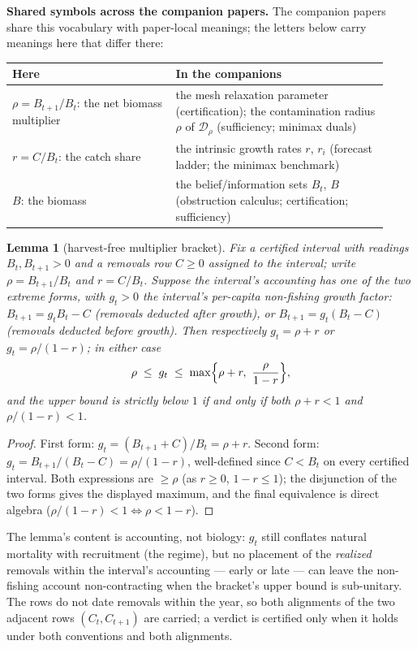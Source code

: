 \documentclass[10pt,twocolumn]{article}
\theoremstyle{plain}
\newtheorem{lemma}[theorem]{Lemma}
\theoremstyle{remark}
\begin{document}
\medskip
\noindent\textbf{Shared symbols across the companion papers.} The
companion papers share this vocabulary with paper-local meanings; the
letters below carry meanings here that differ there:
\begin{center}\small
\begin{tabular}{@{}p{0.40\linewidth}p{0.52\linewidth}@{}}
\toprule
\textbf{Here} & \textbf{In the companions} \\
\midrule
\(\rho = B_{t+1}/B_t\): the net biomass multiplier &
the mesh relaxation parameter (certification); the contamination radius
\(\rho\) of \(\mathcal{D}_{\rho}\) (sufficiency; minimax duals) \\
\(r = C/B_t\): the catch share &
the intrinsic growth rates \(r\), \(r_{i}\) (forecast ladder; the
minimax benchmark) \\
\(B\): the biomass &
the belief/information sets \(B_t\), \(B\) (obstruction calculus;
certification; sufficiency) \\
\bottomrule
\end{tabular}
\end{center}

\begin{lemma}[harvest-free multiplier bracket]\label{lem:bracket}
Fix a certified interval with readings \(B_t, B_{t+1} > 0\) and a
removals row \(C \ge 0\) assigned to the interval; write
\(\rho = B_{t+1}/B_t\) and \(r = C/B_t\). Suppose the interval's
accounting has one of the two extreme forms, with \(g_t > 0\) the
interval's per-capita non-fishing growth factor:
\(B_{t+1} = g_t B_t - C\) (removals deducted after growth), or
\(B_{t+1} = g_t (B_t - C)\) (removals deducted before growth). Then
respectively \(g_t = \rho + r\) or \(g_t = \rho/(1-r)\); in either
case
\[
\rho \;\le\; g_t \;\le\; \max\Bigl\{\rho + r,\ \frac{\rho}{1-r}\Bigr\},
\]
and the upper bound is strictly below \(1\) if and only if both
\(\rho + r < 1\) and \(\rho/(1-r) < 1\).
\end{lemma}

\begin{proof}
First form: \(g_t = (B_{t+1} + C)/B_t = \rho + r\). Second form:
\(g_t = B_{t+1}/(B_t - C) = \rho/(1 - r)\), well-defined since
\(C < B_t\) on every certified interval. Both expressions are
\(\ge \rho\) (as \(r \ge 0\), \(1 - r \le 1\)); the disjunction of the
two forms gives the displayed maximum, and the final equivalence is
direct algebra (\(\rho/(1-r) < 1 \iff \rho < 1 - r\)).
\end{proof}

The lemma's content is accounting, not biology: \(g_t\) still conflates
natural mortality with recruitment (the regime), but no placement of
the \emph{realized} removals within the interval's accounting --- early
or late --- can leave the non-fishing account non-contracting when the
bracket's upper bound is sub-unitary. The rows do not date removals
within the year, so both alignments of the two adjacent rows
\((C_t, C_{t+1})\) are carried; a verdict is certified only when it
holds under both conventions and both alignments.
\end{document}

